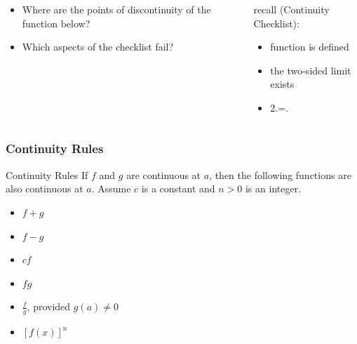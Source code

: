 \documentclass[Cal1Spr16Lectures.tex]{subfiles}
\begin{document}
\begin{frame}\footnotesize
\begin{columns}[T]
	\begin{column}{.65\textwidth}
		\begin{ex} \begin{itemize}
		\item Where are the points of discontinuity of the function below?  
		\item Which aspects of the checklist fail?
		\end{itemize}
		\end{ex}
	\end{column}
	\begin{column}{.4\textwidth}
	\vspace{8pc}
		recall (Continuity Checklist):
			\vspace{-1pc}
			\begin{itemize}
			\item[1.] function is defined
			\item[2.] the two-sided limit exists
			\item[3.] 2.\;=.
			\end{itemize}
	\end{column}
\end{columns}
\end{frame}

\subsubsection{Continuity Rules}

\begin{frame}{\small Continuity Rules}
If $f$ and $g$ are continuous at $a$, then the following functions are also continuous at $a$.  Assume $c$ is a constant and $n>0$ is an integer.
\begin{itemize}
\item[1.] $f+g$
\item[2.] $f-g$
\item[3.] $cf$
\item[4.] $fg$
\item[5.] $\frac{f}{g}$, provided $g(a)\ne 0$
\item[6.] $[f(x)]^n$
\end{itemize}
\end{frame}
\end{document}
